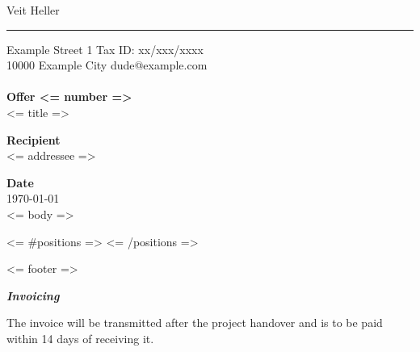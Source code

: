 \documentclass{invoice}
\def \tab {\hspace*{3ex}}
\begin{document}
\hfil{\Huge Veit Heller}\hfil
\bigskip\break
\hrule
\bigskip

Example Street 1 \hfill Tax ID: xx/xxx/xxxx \\
10000 Example City \hfill dude@example.com
\\ \\
{\bf Offer <= number =>} \\
\tab <= title =>

{\bf Recipient} \\
<= addressee =>

{\bf Date} \\
\tab \today \\

<= body =>


\begin{invoiceTable}
\hline
<= #positions =>
<= /positions =>
\end{invoiceTable}

<= footer =>

\textit{\textbf{Invoicing}}

The invoice will be transmitted after the project handover and is to
be paid within 14 days of receiving it.
\end{document}
